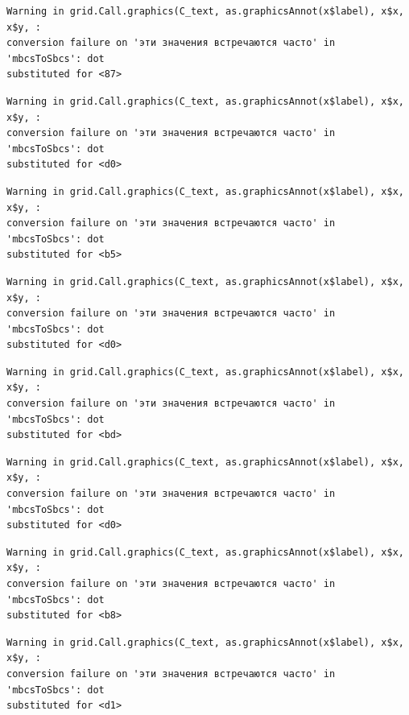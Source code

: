 \documentclass[
  letterpaper,
  DIV=11,
  numbers=noendperiod]{scrreprt}
\theoremstyle{definition}
\theoremstyle{remark}
\begin{document}
\begin{verbatim}
Warning in grid.Call.graphics(C_text, as.graphicsAnnot(x$label), x$x, x$y, :
conversion failure on 'эти значения встречаются часто' in 'mbcsToSbcs': dot
substituted for <87>
\end{verbatim}

\begin{verbatim}
Warning in grid.Call.graphics(C_text, as.graphicsAnnot(x$label), x$x, x$y, :
conversion failure on 'эти значения встречаются часто' in 'mbcsToSbcs': dot
substituted for <d0>
\end{verbatim}

\begin{verbatim}
Warning in grid.Call.graphics(C_text, as.graphicsAnnot(x$label), x$x, x$y, :
conversion failure on 'эти значения встречаются часто' in 'mbcsToSbcs': dot
substituted for <b5>
\end{verbatim}

\begin{verbatim}
Warning in grid.Call.graphics(C_text, as.graphicsAnnot(x$label), x$x, x$y, :
conversion failure on 'эти значения встречаются часто' in 'mbcsToSbcs': dot
substituted for <d0>
\end{verbatim}

\begin{verbatim}
Warning in grid.Call.graphics(C_text, as.graphicsAnnot(x$label), x$x, x$y, :
conversion failure on 'эти значения встречаются часто' in 'mbcsToSbcs': dot
substituted for <bd>
\end{verbatim}

\begin{verbatim}
Warning in grid.Call.graphics(C_text, as.graphicsAnnot(x$label), x$x, x$y, :
conversion failure on 'эти значения встречаются часто' in 'mbcsToSbcs': dot
substituted for <d0>
\end{verbatim}

\begin{verbatim}
Warning in grid.Call.graphics(C_text, as.graphicsAnnot(x$label), x$x, x$y, :
conversion failure on 'эти значения встречаются часто' in 'mbcsToSbcs': dot
substituted for <b8>
\end{verbatim}

\begin{verbatim}
Warning in grid.Call.graphics(C_text, as.graphicsAnnot(x$label), x$x, x$y, :
conversion failure on 'эти значения встречаются часто' in 'mbcsToSbcs': dot
substituted for <d1>
\end{verbatim}
\end{document}
